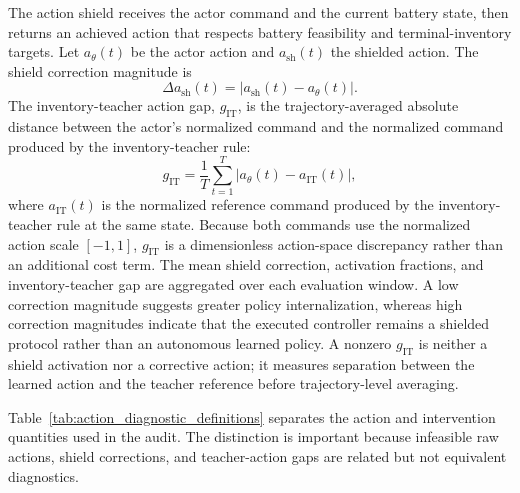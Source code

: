 The action shield receives the actor command and the current battery state, then returns an achieved action that respects battery feasibility and terminal-inventory targets. Let $a_{\theta}(t)$ be the actor action and $a_{\mathrm{sh}}(t)$ the shielded action. The shield correction magnitude is
\begin{equation}
\Delta a_{\mathrm{sh}}(t)=\left|a_{\mathrm{sh}}(t)-a_{\theta}(t)\right|.
\label{eq:shield_delta}
\end{equation}
The inventory-teacher action gap, $g_{\mathrm{IT}}$, is the trajectory-averaged absolute distance between the actor's normalized command and the normalized command produced by the inventory-teacher rule:
\begin{equation}
g_{\mathrm{IT}}=\frac{1}{T}\sum_{t=1}^{T}\left|a_{\theta}(t)-a_{\mathrm{IT}}(t)\right|,
\label{eq:inventory_teacher_gap}
\end{equation}
where $a_{\mathrm{IT}}(t)$ is the normalized reference command produced by the inventory-teacher rule at the same state. Because both commands use the normalized action scale $[-1,1]$, $g_{\mathrm{IT}}$ is a dimensionless action-space discrepancy rather than an additional cost term. The mean shield correction, activation fractions, and inventory-teacher gap are aggregated over each evaluation window. A low correction magnitude suggests greater policy internalization, whereas high correction magnitudes indicate that the executed controller remains a shielded protocol rather than an autonomous learned policy. A nonzero $g_{\mathrm{IT}}$ is neither a shield activation nor a corrective action; it measures separation between the learned action and the teacher reference before trajectory-level averaging.

Table~\ref{tab:action_diagnostic_definitions} separates the action and intervention quantities used in the audit. The distinction is important because infeasible raw actions, shield corrections, and teacher-action gaps are related but not equivalent diagnostics.

